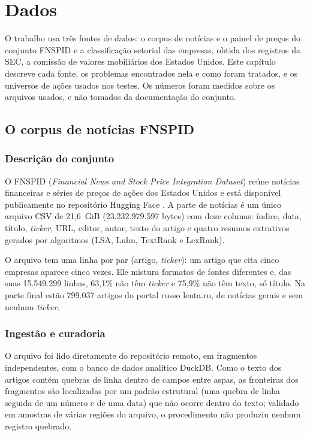 \chapter{Dados}
\label{cap:dados}

O trabalho usa três fontes de dados: o corpus de notícias e o painel de preços do conjunto FNSPID
\citep{dong2024fnspid} e a classificação setorial das empresas, obtida dos registros da SEC, a
comissão de valores mobiliários dos Estados Unidos. Este capítulo descreve cada fonte, os problemas
encontrados nela e como foram tratados, e os universos de ações usados nos testes.
Os números foram medidos sobre os arquivos usados, e não tomados da documentação do conjunto.

\section{O corpus de notícias FNSPID}
\label{sec:fnspid}

\subsection{Descrição do conjunto}

O FNSPID (\emph{Financial News and Stock Price Integration Dataset}) reúne notícias financeiras e
séries de preços de ações dos Estados Unidos e está disponível publicamente no repositório Hugging
Face \citep{dong2024fnspid}. A parte de notícias é um único arquivo CSV de 21,6~GiB
(23.232.979.597 bytes) com doze colunas: índice, data, título, \emph{ticker}, URL, editor, autor, texto
do artigo e quatro resumos extrativos gerados por algoritmos (LSA, Luhn, TextRank e LexRank).

O arquivo tem uma linha por par (artigo, \emph{ticker}): um artigo que cita cinco empresas aparece cinco
vezes. Ele mistura formatos de fontes diferentes e, das suas 15.549.299 linhas, 63,1\% não têm
\emph{ticker} e 75,9\% não têm texto, só título. Na parte final estão 799.037 artigos do portal russo
lenta.ru, de notícias gerais e sem nenhum \emph{ticker}.

\subsection{Ingestão e curadoria}

O arquivo foi lido diretamente do repositório remoto, em fragmentos independentes, com o banco de dados
analítico DuckDB. Como o texto dos artigos contém quebras de linha dentro de campos entre aspas, as
fronteiras dos fragmentos são localizadas por um padrão estrutural (uma quebra de linha seguida de um
número e de uma data) que não ocorre dentro do texto; validado em amostras de várias regiões do arquivo,
o procedimento não produziu nenhum registro quebrado.

